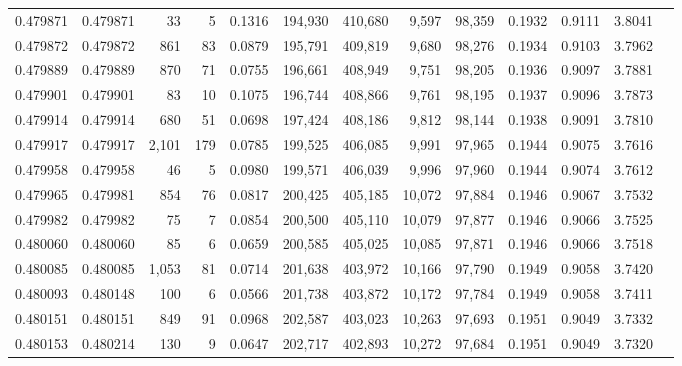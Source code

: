 \begin{tabular}{rrrrrrrrrrrrr}
0.479871 & 0.479871 &    33 &     5 &                                     0.1316 & 194,930 & 410,680 &   9,597 &  98,359 & 0.1932 & 0.9111 & 3.8041 \\
0.479872 & 0.479872 &   861 &    83 &                                     0.0879 & 195,791 & 409,819 &   9,680 &  98,276 & 0.1934 & 0.9103 & 3.7962 \\
0.479889 & 0.479889 &   870 &    71 &                                     0.0755 & 196,661 & 408,949 &   9,751 &  98,205 & 0.1936 & 0.9097 & 3.7881 \\
0.479901 & 0.479901 &    83 &    10 &                                     0.1075 & 196,744 & 408,866 &   9,761 &  98,195 & 0.1937 & 0.9096 & 3.7873 \\
0.479914 & 0.479914 &   680 &    51 &                                     0.0698 & 197,424 & 408,186 &   9,812 &  98,144 & 0.1938 & 0.9091 & 3.7810 \\
0.479917 & 0.479917 & 2,101 &   179 &                                     0.0785 & 199,525 & 406,085 &   9,991 &  97,965 & 0.1944 & 0.9075 & 3.7616 \\
0.479958 & 0.479958 &    46 &     5 &                                     0.0980 & 199,571 & 406,039 &   9,996 &  97,960 & 0.1944 & 0.9074 & 3.7612 \\
0.479965 & 0.479981 &   854 &    76 &                                     0.0817 & 200,425 & 405,185 &  10,072 &  97,884 & 0.1946 & 0.9067 & 3.7532 \\
0.479982 & 0.479982 &    75 &     7 &                                     0.0854 & 200,500 & 405,110 &  10,079 &  97,877 & 0.1946 & 0.9066 & 3.7525 \\
0.480060 & 0.480060 &    85 &     6 &                                     0.0659 & 200,585 & 405,025 &  10,085 &  97,871 & 0.1946 & 0.9066 & 3.7518 \\
0.480085 & 0.480085 & 1,053 &    81 &                                     0.0714 & 201,638 & 403,972 &  10,166 &  97,790 & 0.1949 & 0.9058 & 3.7420 \\
0.480093 & 0.480148 &   100 &     6 &                                     0.0566 & 201,738 & 403,872 &  10,172 &  97,784 & 0.1949 & 0.9058 & 3.7411 \\
0.480151 & 0.480151 &   849 &    91 &                                     0.0968 & 202,587 & 403,023 &  10,263 &  97,693 & 0.1951 & 0.9049 & 3.7332 \\
0.480153 & 0.480214 &   130 &     9 &                                     0.0647 & 202,717 & 402,893 &  10,272 &  97,684 & 0.1951 & 0.9049 & 3.7320 \\

\end{tabular}
